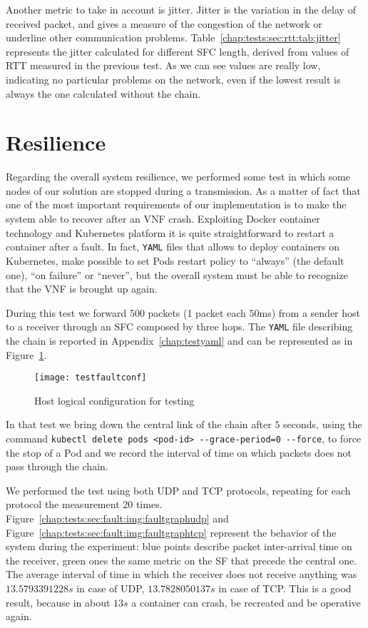 \noindent
Another metric to take in account is jitter. Jitter is the variation in the
delay of received packet, and gives a measure of the congestion of the network
or underline other communication problems.
Table~\ref{chap:tests:sec:rtt:tab:jitter} represents the jitter calculated for
different SFC length, derived from values of RTT measured in the previous test.
As we can see values are really low, indicating no particular problems on the
network, even if the lowest result is always the one calculated without the
chain.

\section{Resilience}
Regarding the overall system resilience, we performed some test in which some
nodes of our solution are stopped during a transmission. As a matter of fact
that one of the most important requirements of our implementation is to make
the system able to recover after an VNF crash. Exploiting Docker container
technology and Kubernetes platform it is quite straightforward to restart a
container after a fault. In fact, \texttt{YAML} files that allows to deploy
containers on Kubernetes, make possible to set Pods restart policy to
``always'' (the default one), ``on failure'' or ``never'', but the overall
system must be able to recognize that the VNF is brought up again. 

During this test we forward 500 packets (1 packet each 50ms) from a sender
host to a receiver through an SFC composed by three hops. The \texttt{YAML} file
describing the chain is reported in Appendix~\ref{chap:testyaml} and can be
represented as in Figure~\ref{chap:tests:sec:fault:img:testfaultconf}.
\begin{figure}[H]
  \centering
  \texttt{[image: testfaultconf]}
  \caption{Host logical configuration for testing}
  \label{chap:tests:sec:fault:img:testfaultconf}
\end{figure}

\noindent
In that test we bring down the central link of the chain after $5$ seconds,
using the command \verb!kubectl delete pods <pod-id> --grace-period=0 --force!,
to force the stop of a Pod and we record the interval of time on which packets
does not pass through the chain.

We performed the test using both UDP and TCP protocols, repeating for each
protocol the measurement $20$ times.
Figure~\ref{chap:tests:sec:fault:img:faultgraphudp} and
Figure~\ref{chap:tests:sec:fault:img:faultgraphtcp} represent the behavior of
the system during the experiment: blue points describe packet inter-arrival
time on the receiver, green ones the same metric on the SF that precede the
central one. The average interval of time in which the
receiver does not receive anything was $13.5793391228s$ in case of UDP,
$13.7828050137s$ in case of TCP. This is a good result, because in about $13s$ a
container can crash, be recreated and be operative again. 

